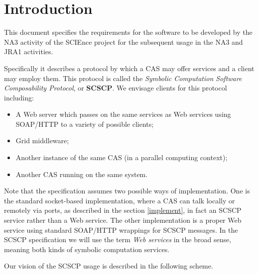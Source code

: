 \documentclass{amsart}
\begin{document}
\newpage

\tableofcontents
\newpage

\section{Introduction}

This document specifies the requirements for the software to be developed
by the NA3 activity of the SCIEnce project for the subsequent usage in the
NA3 and JRA1 activities.

Specifically it describes a protocol by which a CAS may offer
services and a client may employ them. This protocol is called the
{\it Symbolic Computation Software Composability Protocol}, or {\bf SCSCP}.
We envisage clients for this protocol including:

\begin{itemize}
\item A Web server which passes on the same services as Web services
  using SOAP/HTTP to a variety of possible clients;
\item Grid middleware;
\item Another instance of the same CAS (in a parallel computing context);
\item Another CAS running on the same system.
\end{itemize}

Note that the specification assumes two possible ways of implementation.
One is the standard socket-based implementation, where a CAS can 
talk locally or remotely via ports, as described in the section \ref{implement},
in fact an SCSCP service rather than a Web service. 
The other implementation is a proper Web service using standard SOAP/HTTP wrappings for SCSCP messages. 
In the SCSCP specification we will use the term {\it Web services} in the broad sense, 
meaning both kinds of symbolic computation services.

Our vision of the SCSCP usage is described in the following scheme.

\centerline{}
\end{document}
